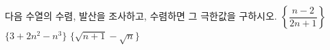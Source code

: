 다음 수열의 수렴, 발산을 조사하고, 수렴하면 그 극한값을 구하시오.
 $\left\{\dfrac{n-2}{2n+1}\right\}$
 $\{3+2n^2-n^3\}$
 $\{\sqrt{n+1}-\sqrt{n}\}$
